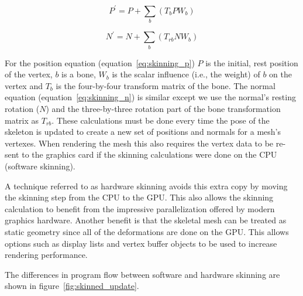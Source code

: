 \begin{equation}
 \label{eq:skinning_p}
  P^\prime = P + \sum_b{\left(T_bPW_b\right)}
\end{equation}

\begin{equation}
 \label{eq:skinning_n}
 N^\prime = N + \sum_b{\left(T_{rb}NW_b\right)}
\end{equation}

For the position equation (equation~\ref{eq:skinning_p}) $P$ is the initial, rest position of the vertex, $b$ is a bone, $W_b$ is the scalar influence (i.e., the weight) of $b$ on the vertex and $T_b$ is the four-by-four transform matrix of the bone.
The normal equation (equation~\ref{eq:skinning_n}) is similar except we use the normal's resting rotation ($N$) and the three-by-three rotation part of the bone transformation matrix as $T_{rb}$.
These calculations must be done every time the pose of the skeleton is updated to create a new set of positions and normals for a mesh's vertexes.
When rendering the mesh this also requires the vertex data to be re-sent to the graphics card if the skinning calculations were done on the CPU (software skinning).

A technique referred to as hardware skinning avoids this extra copy by moving the skinning step from the CPU to the GPU.
This also allows the skinning calculation to benefit from the impressive parallelization offered by modern graphics hardware.
Another benefit is that the skeletal mesh can be treated as static geometry since all of the deformations are done on the GPU.
This allows options such as display lists and vertex buffer objects\cite{ARB_texture_buffer_object} to be used to increase rendering performance.

The differences in program flow between software and hardware skinning are shown in figure~\ref{fig:skinned_update}.


